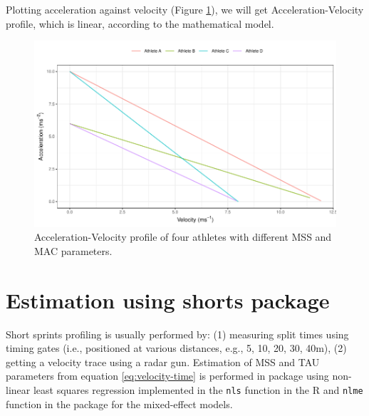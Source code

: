 \documentclass[
]{jss}
\begin{document}
Plotting acceleration against velocity (Figure \ref{fig:four-athletes-profile}), we will get Acceleration-Velocity profile, which is linear, according to the mathematical model.

\begin{CodeChunk}
\begin{figure}

{\centering \includegraphics[width=1\linewidth]{paper_files/figure-latex/four-athletes-profile-1} 

}

\caption[Acceleration-Velocity profile of four athletes with different MSS and MAC parameters]{Acceleration-Velocity profile of four athletes with different MSS and MAC parameters.}\label{fig:four-athletes-profile}
\end{figure}
\end{CodeChunk}

\hypertarget{estimation-using-shorts-package}{%
\section{Estimation using shorts package}\label{estimation-using-shorts-package}}

Short sprints profiling is usually performed by: (1) measuring split times using timing gates (i.e., positioned at various distances, e.g., 5, 10, 20, 30, 40m), (2) getting a velocity trace using a radar gun. Estimation of MSS and TAU parameters from equation \eqref{eq:velocity-time} is performed in  package using non-linear least squares regression implemented in the \texttt{nls} function in the  R \citep{R-base} and \texttt{nlme} function in the  package \citep{R-nlme} for the mixed-effect models.
\end{document}
